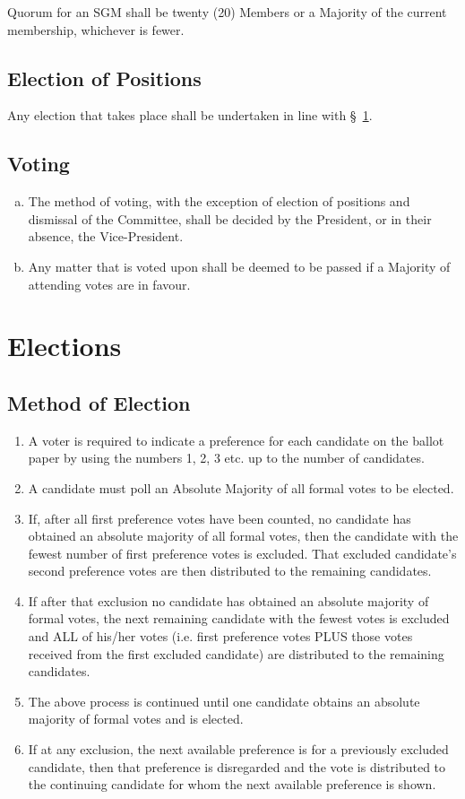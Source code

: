 \documentclass[a4paper,12pt]{article}
\begin{document}
Quorum for an SGM shall be twenty (20) Members or a Majority of the current membership, whichever is fewer.

\subsection{Election of Positions}

Any election that takes place shall be undertaken in line with \S~\ref{elections}.

\subsection{Voting}

\begin{enumerate}[a)]
	\item The method of voting, with the exception of election of positions and dismissal of the Committee, shall be decided by the President, or in their absence, the Vice-President.
	\item Any matter that is voted upon shall be deemed to be passed if a Majority of attending votes are in favour.
\end{enumerate}

\section{Elections}
\label{elections}

\subsection{Method of Election}

\begin{enumerate}
	\item A voter is required to indicate a preference for each candidate on the ballot paper by using the numbers 1, 2, 3 etc. up to the number of candidates.
	\item A candidate must poll an Absolute Majority of all formal votes to be elected.
	\item If, after all first preference votes have been counted, no candidate has obtained an absolute majority of all formal votes, then the candidate with the fewest number of first preference votes is excluded. That excluded candidate's second preference votes are then distributed to the remaining candidates.
	\item If after that exclusion no candidate has obtained an absolute majority of formal votes, the next remaining candidate with the fewest votes is excluded and ALL of his/her votes (i.e. first preference votes PLUS those votes received from the first excluded candidate) are distributed to the remaining candidates.
	\item The above process is continued until one candidate obtains an absolute majority of formal votes and is elected.
	\item If at any exclusion, the next available preference is for a previously excluded candidate, then that preference is disregarded and the vote is distributed to the continuing candidate for whom the next available preference is shown.
\end{enumerate}
\end{document}
